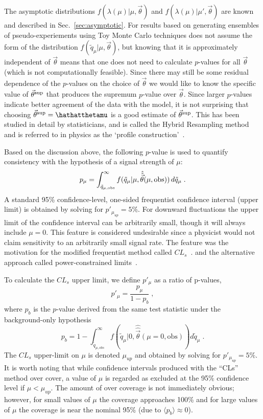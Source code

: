 The asymptotic distributions \mbox{$f(\lambda(\mu) | \mu, \vec\theta)$} and \mbox{$f(\lambda(\mu) | \mu', \vec\theta)$} are known and described in Sec.~\ref{sec:asymptotic}.  For results based on generating ensembles of pseudo-experiements using Toy Monte Carlo techniques does not assume the form of the distribution $f(\tilde{q}_\mu | \mu, \vec\theta)$, but knowing that it is approximately independent of $\vec\theta$ means that one does not need to calculate $p$-values for all $\vec\theta$ (which is not computationally feasible).  Since there may still be some residual dependence of the $p$-values on the choice of $\vec\theta$ we would like to know the specific value of $\vec\theta^{\rm sup}$ that produces the supremum $p$-value over $\vec\theta$.  Since larger $p$-values indicate better agreement of the data with the model, it is not surprising that choosing $\vec\theta^{\rm sup}=\hathatthetamu$ is a good estimate of $\vec\theta^{\rm sup}$.  This has been studied in detail by statisticians, and is called the Hybrid Resampling method and is referred to in physics as the `profile construction'~\cite{Feldman,Cranmer,hybridResampling,Bodhi}.


Based on the discussion above, the following $p$-value is used to quantify consistency with the hypothesis of a signal strength of $\mu$:
\begin{equation}
p_{\mu}=\int_{\tilde q_{\mu,\rm obs}}^{\infty} f(\tilde q_\mu|\mu,\hat{\hat{\vec{\theta}}}(\mu,\textrm{obs})) \,d\tilde q_\mu \;.
\end{equation}
A standard 95\% confidence-level, one-sided frequentist confidence interval (upper limit) is obtained by  solving for $p'_{\mu_{up}}=5\%$.  For downward fluctuations the upper limit of the confidence interval can be arbitrarily small, though it will always include $\mu=0$.  This feature is considered undesirable since a physicist would not claim sensitivity to an arbitrarily small signal rate.  The feature was the motivation for the modified frequentist method called $CL_s$~\cite{Read2,Read1,CLsWikipedia}. and the alternative approach called power-constrained limits~\cite{2011arXiv1105.3166C}. 


To calculate the $CL_s$ upper limit, we define $p'_\mu$ as a ratio of p-values,
\begin{equation}
p'_\mu=\frac{p_\mu}{1-p_b} \; ,
\end{equation}
where  $p_b$ is the $p$-value derived from the same test statistic under the background-only hypothesis
\begin{equation}
\label{eq:pb}
p_b=1-\int_{\tilde q_{\mu,obs}}^\infty f(\tilde q_\mu|0,\hat{\hat{\vec{\theta}}}(\mu=0,\textrm{obs}))d\tilde q_\mu \;.
\end{equation}
The $CL_s$ upper-limit on $\mu$ is denoted $\mu_{up}$ and obtained by solving for $p'_{\mu_{up}}=5\%$.  
It is worth noting that while confidence intervals produced with the ``CLs'' method over cover, a value of $\mu$ is regarded as excluded at the 95\% confidence level if $\mu<\mu_{up}$.  The amount of over coverage is not immediately obvious; however, for small values of $\mu$ the coverage approaches 100\% and for large values of $\mu$ the coverage is near the nominal 95\% (due to $\langle p_b\rangle\approx0$).


